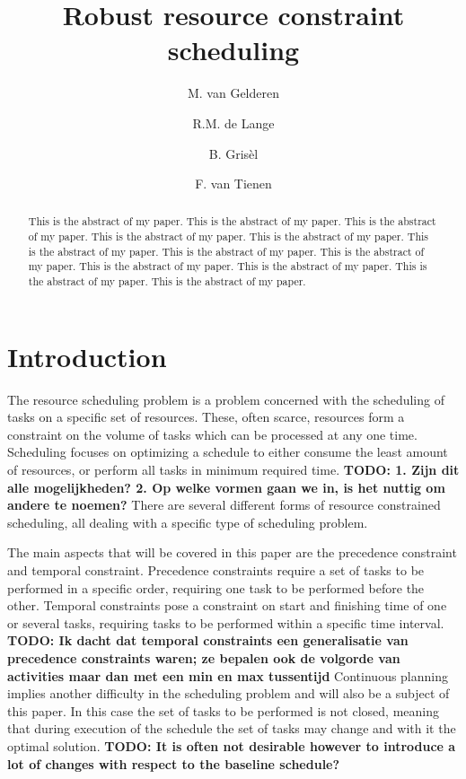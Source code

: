 \documentclass{article}
\title{Robust resource constraint scheduling}
\author{M. van Gelderen  \and
    R.M. de Lange \and
    B. Gris\`el \and
    F. van Tienen}
\newcommand{\TODO}[1]{{\color{red}\textbf{TODO: #1}}}
\begin{document}
\maketitle
\thispagestyle{empty}

\begin{abstract}
This is the abstract of my paper.
This is the abstract of my paper.
This is the abstract of my paper.
This is the abstract of my paper.
This is the abstract of my paper.
This is the abstract of my paper.
This is the abstract of my paper.
This is the abstract of my paper.
This is the abstract of my paper.
This is the abstract of my paper.
This is the abstract of my paper.
This is the abstract of my paper.
\end{abstract}


\section{Introduction}


The resource scheduling problem is a problem concerned with the scheduling of tasks on a specific set of resources. These, often scarce, resources form a constraint on the volume of tasks which can be processed at any one time. Scheduling focuses on optimizing a schedule to either consume the least amount of resources, or perform all tasks in minimum required time. \TODO{1. Zijn dit alle mogelijkheden? 2. Op welke vormen gaan we in, is het nuttig om andere te noemen?} There are several different forms of resource constrained scheduling, all dealing with a specific type of scheduling problem.

The main aspects that will be covered in this paper are the precedence constraint and temporal constraint. Precedence constraints require a set of tasks to be performed in a specific order, requiring one task to be performed before the other. Temporal constraints pose a constraint on start and finishing time of one or several tasks, requiring tasks to be performed within a specific time interval. \TODO{Ik dacht dat temporal constraints een generalisatie van precedence constraints waren; ze bepalen ook de volgorde van activities maar dan met een min en max tussentijd} Continuous planning implies another difficulty in the scheduling problem and will also be a subject of this paper. In this case the set of tasks to be performed is not closed, meaning that during execution of the schedule the set of tasks may change and with it the optimal solution. \TODO{It is often not desirable however to introduce a lot of changes with respect to the baseline schedule?}
\end{document}
